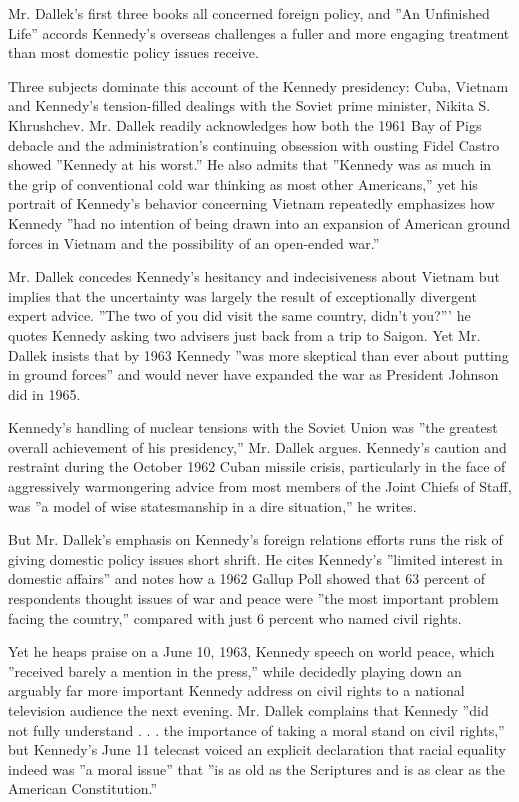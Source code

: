 Mr. Dallek's first three books all concerned foreign policy, and ''An
Unfinished Life'' accords Kennedy's overseas challenges a fuller and
more engaging treatment than most domestic policy issues receive.

Three subjects dominate this account of the Kennedy presidency: Cuba,
Vietnam and Kennedy's tension-filled dealings with the Soviet prime
minister, Nikita S. Khrushchev. Mr. Dallek readily acknowledges how both
the 1961 Bay of Pigs debacle and the administration's continuing
obsession with ousting Fidel Castro showed ''Kennedy at his worst.'' He
also admits that ''Kennedy was as much in the grip of conventional cold
war thinking as most other Americans,'' yet his portrait of Kennedy's
behavior concerning Vietnam repeatedly emphasizes how Kennedy ''had no
intention of being drawn into an expansion of American ground forces in
Vietnam and the possibility of an open-ended war.''

Mr. Dallek concedes Kennedy's hesitancy and indecisiveness about Vietnam
but implies that the uncertainty was largely the result of exceptionally
divergent expert advice. ''The two of you did visit the same country,
didn't you?''' he quotes Kennedy asking two advisers just back from a
trip to Saigon. Yet Mr. Dallek insists that by 1963 Kennedy ''was more
skeptical than ever about putting in ground forces'' and would never
have expanded the war as President Johnson did in 1965.

Kennedy's handling of nuclear tensions with the Soviet Union was ''the
greatest overall achievement of his presidency,'' Mr. Dallek argues.
Kennedy's caution and restraint during the October 1962 Cuban missile
crisis, particularly in the face of aggressively warmongering advice
from most members of the Joint Chiefs of Staff, was ''a model of wise
statesmanship in a dire situation,'' he writes.

But Mr. Dallek's emphasis on Kennedy's foreign relations efforts runs
the risk of giving domestic policy issues short shrift. He cites
Kennedy's ''limited interest in domestic affairs'' and notes how a 1962
Gallup Poll showed that 63 percent of respondents thought issues of war
and peace were ''the most important problem facing the country,''
compared with just 6 percent who named civil rights.

Yet he heaps praise on a June 10, 1963, Kennedy speech on world peace,
which ''received barely a mention in the press,'' while decidedly
playing down an arguably far more important Kennedy address on civil
rights to a national television audience the next evening. Mr. Dallek
complains that Kennedy ''did not fully understand . . . the importance
of taking a moral stand on civil rights,'' but Kennedy's June 11
telecast voiced an explicit declaration that racial equality indeed was
''a moral issue'' that ''is as old as the Scriptures and is as clear as
the American Constitution.''

